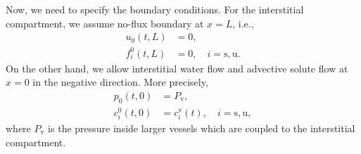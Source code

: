 \documentclass{article}
\begin{document}
Now, we need to specify the boundary conditions.
For the interstitial compartment, we assume no-flux boundary at $x=L$, i.e.,
\begin{align}
    u_0(t,L) &= 0,\\ 
    f_i^0(t,L)&=0,\quad i=\mathrm{s},\mathrm{u}.
\end{align}
On the other hand, we allow interstitial water flow and advective solute flow at $x=0$ in the negative direction.
More precisely,
\begin{align}
    p_0(t,0) &= P_{\mathrm{v}},\\ 
    c_i^0(t,0) &= c_i^\mathrm{v}(t),\quad i=\mathrm{s},\mathrm{u},
\end{align}
    where $P_{\mathrm{v}}$ is the pressure inside larger vessels which are coupled to the interstitial compartment.
\end{document}
